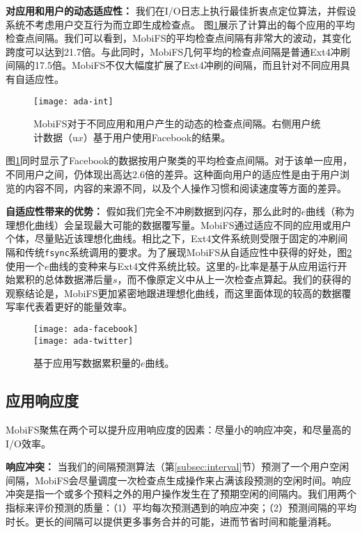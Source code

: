 \noindent\textbf{对应用和用户的动态适应性：}
我们在I/O日志上执行最佳折衷点定位算法，并假设系统不考虑用户交互行为而立即生成检查点。
图\ref{fig:ada-int}展示了计算出的每个应用的平均检查点间隔。我们可以看到，MobiFS的平均检查点间隔有非常大的波动，其变化跨度可以达到21.7倍。与此同时，MobiFS几何平均的检查点间隔是普通Ext4冲刷间隔的17.5倍。MobiFS不仅大幅度扩展了Ext4冲刷的间隔，而且针对不同应用具有自适应性。

\begin{figure}[!ht]
  \centering
  \texttt{[image: ada-int]}
  \caption{MobiFS对于不同应用和用户产生的动态的检查点间隔。右侧用户统计数据（u$x$）基于用户使用Facebook的结果。}
  \label{fig:ada-int}
\end{figure}

图\ref{fig:ada-int}同时显示了Facebook的数据按用户聚类的平均检查点间隔。对于该单一应用，不同用户之间，仍体现出高达2.6倍的差异。这种面向用户的适应性是由于用户浏览的内容不同，内容的来源不同，以及个人操作习惯和阅读速度等方面的差异。

\noindent\textbf{自适应性带来的优势：}
假如我们完全不冲刷数据到闪存，那么此时的$e$曲线（称为理想化曲线）会呈现最大可能的数据覆写量。MobiFS通过适应不同的应用或用户个体，尽量贴近该理想化曲线。相比之下，Ext4文件系统则受限于固定的冲刷间隔和传统\texttt{fsync}系统调用的要求。为了展现MobiFS从自适应性中获得的好处，图\ref{fig:spa-ada}使用一个$e$曲线的变种来与Ext4文件系统比较。这里的$e$比率是基于从应用运行开始累积的总体数据滞后量$s$，而不像原定义中从上一次检查点算起。我们的获得的观察结论是，MobiFS更加紧密地跟进理想化曲线，而这里面体现的较高的数据覆写率代表着更好的能量效率。

\begin{figure}[!ht]
\centering
\texttt{[image: ada-facebook]}\\
\texttt{[image: ada-twitter]}\\
\caption{基于应用写数据累积量的$e$曲线。}
\label{fig:spa-ada}
\end{figure}

\subsection{应用响应度} \label{subsec-eval-resp}

MobiFS聚焦在两个可以提升应用响应度的因素：尽量小的响应冲突，和尽量高的I/O效率。

\noindent\textbf{响应冲突：}
当我们的间隔预测算法（第\ref{subsec:interval}节）预测了一个用户空闲间隔，MobiFS会尽量调度一次检查点生成操作来占满该段预测的空闲时间。响应冲突是指一个或多个预料之外的用户操作发生在了预期空闲的间隔内。我们用两个指标来评价预测的质量：（1）平均每次预测遇到的响应冲突；（2）预测间隔的平均时长。更长的间隔可以提供更多事务合并的可能，进而节省时间和能量消耗。

